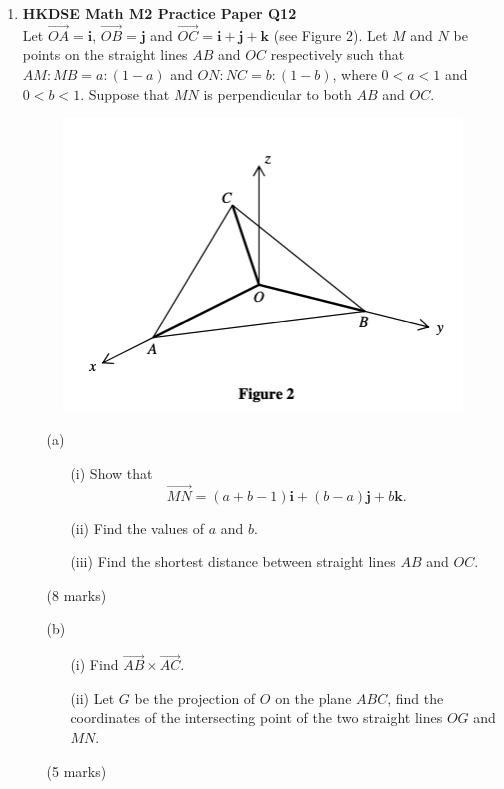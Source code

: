 \documentclass{report}
\begin{document}
\begin{enumerate}
	\item \textbf{HKDSE Math M2 Practice Paper Q12}\\
	Let $\overrightarrow{OA} = \textbf{i}$, $\overrightarrow{OB} = \textbf{j}$ and $\overrightarrow{OC} = \textbf{i} + \textbf{j} + \textbf{k}$ (see Figure 2). Let $M$ and $N$ be points on the straight lines $AB$ and $OC$ respectively such that $AM:MB = a:(1-a)$ and $ON:NC = b:(1-b)$, where $0 < a < 1$ and $0 < b < 1$. Suppose that $MN$ is perpendicular to both $AB$ and $OC$.
	\begin{figure}[H]
		\centering
		\includegraphics[width = .5\linewidth]{PPFigure2}
	\end{figure}
	\begin{enumerate}
		\item [(a)]
		\begin{enumerate}
			\item [(i)]Show that $$\overrightarrow{MN} = (a+b-1)\textbf{i} +(b-a) \textbf{j} +b \textbf{k}.$$
			\item [(ii)]Find the values of $a$ and $b$.
			\item [(iii)]Find the shortest distance between straight lines $AB$ and $OC$.
		\end{enumerate}
		(8 marks)
		\item [(b)]
		\begin{enumerate}
			\item [(i)]Find $\overrightarrow{AB}\times\overrightarrow{AC}$. 
			\item [(ii)]Let $G$ be the projection of $O$ on the plane $ABC$, find the coordinates of the intersecting point of the two straight lines $OG$ and $MN$.
		\end{enumerate}
		(5 marks)
  	\end{enumerate}


\end{enumerate}
\end{document}
